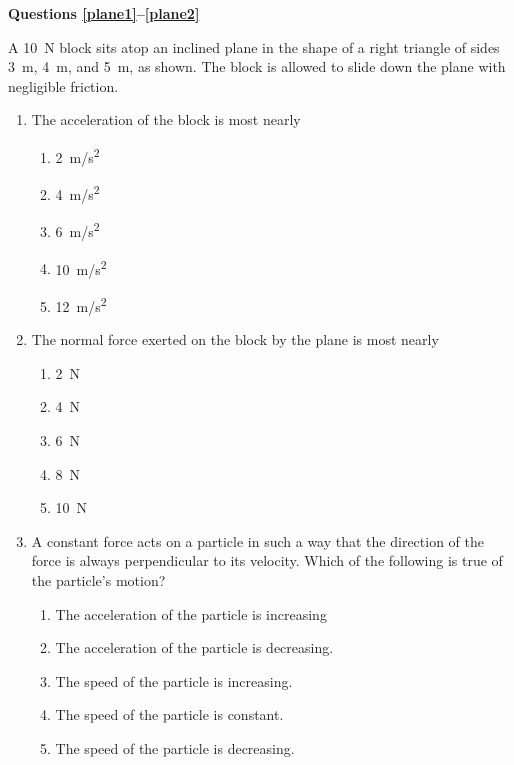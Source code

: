 \documentclass{../../../oss-apphys}
\begin{document}
\begin{multicols}{2}
  \textbf{Questions \ref{plane1}--\ref{plane2}}

  A \SI{10}{\newton} block sits atop an inclined plane in the shape of a
  right triangle of sides \SI{3}{\metre}, \SI{4}{\metre}, and \SI{5}{\metre},
  as shown. The block is allowed to slide down the plane with negligible
  friction.
  \vspace{-.2in}
  
  \begin{enumerate}[resume,leftmargin=18pt]
  \item The acceleration of the block is most nearly
    \begin{enumerate}[noitemsep,topsep=0pt,leftmargin=18pt,label=(\Alph*)]
    \item\SI{2}{m/s^2}
    \item\SI{4}{m/s^2}
    \item\SI{6}{m/s^2}
    \item\SI{10}{m/s^2}
    \item\SI{12}{m/s^2}
    \end{enumerate}
    \label{plane1}
    
  \item The normal force exerted on the block by the plane is most nearly
    \begin{enumerate}[noitemsep,topsep=0pt,leftmargin=18pt,label=(\Alph*)]
    \item\SI{2}{\newton}
    \item\SI{4}{\newton}
    \item\SI{6}{\newton}
    \item\SI{8}{\newton}
    \item\SI{10}{\newton}
    \end{enumerate}
    \label{plane2}
  
  \item A constant force acts on a particle in such a way that the direction of
    the force is always perpendicular to its velocity. Which of the
    following is true of the particle's motion?
    \begin{enumerate}[noitemsep,topsep=0pt,leftmargin=18pt,label=(\Alph*)]
    \item The acceleration of the particle is increasing
    \item The acceleration of the particle is decreasing.
    \item The speed of the particle is increasing.
    \item The speed of the particle is constant.
    \item The speed of the particle is decreasing.
    \end{enumerate}


\end{enumerate}
\end{multicols}
\end{document}
